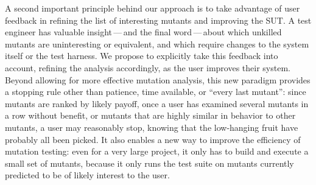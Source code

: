 A second important principle behind our approach is to take advantage of user
feedback in refining the list of interesting mutants and improving the SUT.
A test engineer has valuable insight\,---\,and the final word\,---\,about which
unkilled mutants are uninteresting or equivalent, and which require changes to
the system itself or the test harness.  We propose to explicitly take this
feedback into account, refining the analysis accordingly, as the user improves
their system.  Beyond allowing for more effective mutation analysis,
this new paradigm provides a stopping rule other than patience, time available, or
``every last mutant'':  since mutants are ranked by likely payoff, once a user
has examined several mutants in a row without benefit, or mutants that are highly
similar in behavior to other mutants, a user may reasonably stop, knowing that
the low-hanging fruit have probably all been picked.
 It also enables a new way to improve the efficiency of
mutation testing:  even for a very large project, it only has to build and
execute a small set of mutants, because it only runs the test suite on mutants
currently predicted to be of likely interest to the user.

